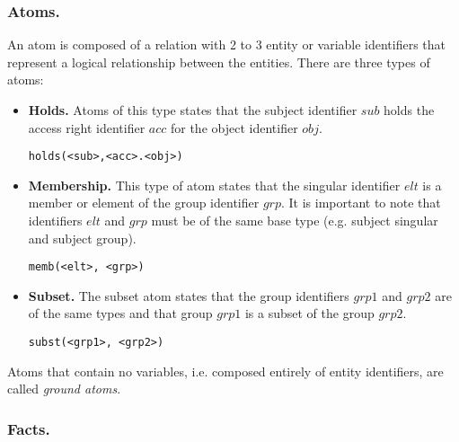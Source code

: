 \documentclass[11pt]{llncs}
\begin{document}
      \subsubsection{Atoms.}

        An atom is composed of a relation with 2 to 3 entity or variable
        identifiers that represent a logical relationship between the entities.
        There are three types of atoms:

        \begin{itemize}
          \item
            {\bf Holds.} Atoms of this type states that the subject
            identifier $sub$ holds the access right identifier $acc$ for the
            object identifier $obj$.

            \begin{verbatim}holds(<sub>,<acc>.<obj>)\end{verbatim}

          \vspace{1mm}
          \item
            {\bf Membership.} This type of atom states that the singular
            identifier $elt$ is a member or element of the group identifier
            $grp$. It is important to note that identifiers $elt$ and $grp$
            must be of the same base type (e.g. subject singular and subject
            group).

            \begin{verbatim}memb(<elt>, <grp>)\end{verbatim}

          \vspace{1mm}
          \item
            {\bf Subset.} The subset atom states that the group identifiers
            $grp1$ and $grp2$ are of the same types and that group $grp1$ is
            a subset of the group $grp2$.

            \begin{verbatim}subst(<grp1>, <grp2>)\end{verbatim}
        \end{itemize}

        Atoms that contain no variables, i.e. composed entirely of entity
        identifiers, are called {\em ground atoms}.

      \subsubsection{Facts.}
\end{document}
